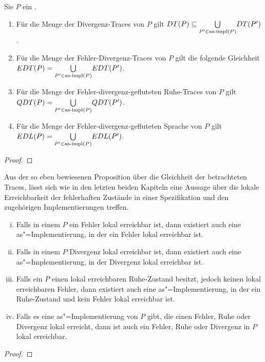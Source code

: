 \vspace{0.2cm}

\begin{Prop}
  Sie $P$ ein \MEIO{}.
  \begin{enumerate}
    \item Für die Menge der Divergenz-Traces von $P$ gilt $DT (P) \subseteq
      \underset{P'\in\mathrm{as}\text{-}\mathrm{impl} (P)}{\bigcup} DT (P')$.
    \item Für die Menge der Fehler-Divergenz-Traces von $P$ gilt die folgende
      Gleichheit $EDT (P) = \underset{P'\in\mathrm{as}\text{-}\mathrm{impl} (P)}{\bigcup} EDT (P')$.
    \item Für die Menge der Fehler-divergenz-gefluteten Ruhe-Traces von $P$
      gilt $QDT (P) = \underset{P'\in\mathrm{as}\text{-}\mathrm{impl} (P)}{\bigcup} QDT (P')$.
    \item Für die Menge der Fehler-divergenz-gefluteten Sprache von $P$ gilt
      $EDL (P) = \underset{P'\in\mathrm{as}\text{-}\mathrm{impl} (P)}{\bigcup} EDL (P')$.
  \end{enumerate}
\end{Prop}
\begin{proof}
\end{proof}

Aus der so eben bewiesenen Proposition über die Gleichheit der betrachteten
Traces, lässt sich wie in den letzten beiden Kapiteln eine Aussage über die
lokale Erreichbarkeit der \glqq fehlerhaften Zustände\grqq{} in einer
Spezifikation und den zugehörigen Implementierungen treffen.

\begin{Kor}
  \begin{enumerate}[(i)]
    \item Falls in einem \MEIO{} $P$ ein Fehler lokal erreichbar ist, dann
      existiert auch eine as"=Implementierung, in der ein Fehler lokal
      erreichbar ist.
    \item Falls in einem \MEIO{} $P$ Divergenz lokal erreichbar ist, dann
      existiert auch eine as"=Implementierung, in der Divergenz lokal erreichbar
      ist.
    \item Falls ein \MEIO{} $P$ einen lokal erreichbaren Ruhe-Zustand besitzt,
      jedoch keinen lokal erreichbaren Fehler, dann existiert auch eine
      as"=Implementierung, in der ein Ruhe-Zustand und kein Fehler lokal
      erreichbar ist.
    \item Falls es eine as"=Implementierung von $P$ gibt, die einen Fehler,
      Ruhe oder Divergenz lokal erreicht, dann ist auch ein Fehler, Ruhe oder
      Divergenz in $P$ lokal erreichbar.
  \end{enumerate}
\end{Kor}
\begin{proof}
\end{proof}

